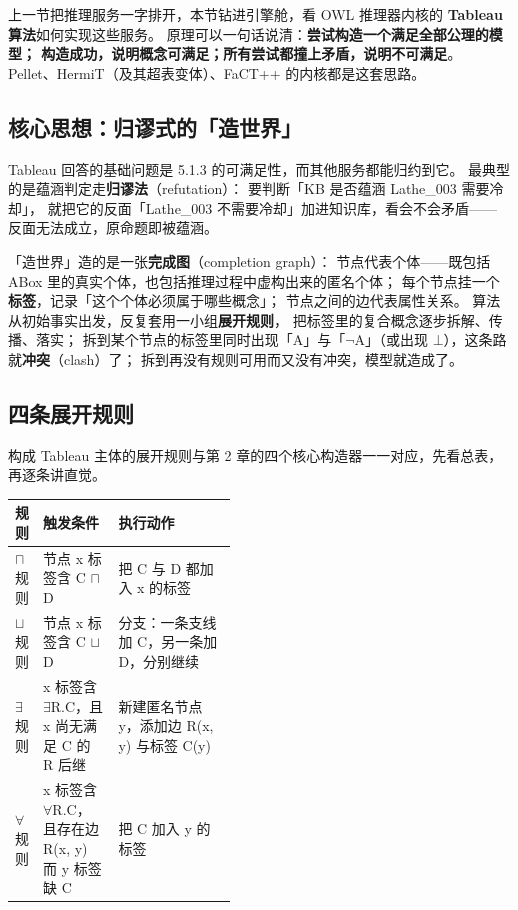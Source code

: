 上一节把推理服务一字排开，本节钻进引擎舱，看 OWL 推理器内核的
\textbf{Tableau 算法}如何实现这些服务。
原理可以一句话说清：\textbf{尝试构造一个满足全部公理的模型；
构造成功，说明概念可满足；所有尝试都撞上矛盾，说明不可满足}。
Pellet、HermiT（及其超表变体）、FaCT++ 的内核都是这套思路。

\subsection{核心思想：归谬式的「造世界」}

Tableau 回答的基础问题是 5.1.3 的可满足性，而其他服务都能归约到它。
最典型的是蕴涵判定走\textbf{归谬法}（refutation）：
要判断「KB 是否蕴涵 Lathe\_003 需要冷却」，
就把它的反面「Lathe\_003 不需要冷却」加进知识库，看会不会矛盾——
反面无法成立，原命题即被蕴涵。

「造世界」造的是一张\textbf{完成图}（completion graph）：
节点代表个体——既包括 ABox 里的真实个体，也包括推理过程中虚构出来的匿名个体；
每个节点挂一个\textbf{标签}，记录「这个个体必须属于哪些概念」；
节点之间的边代表属性关系。
算法从初始事实出发，反复套用一小组\textbf{展开规则}，
把标签里的复合概念逐步拆解、传播、落实；
拆到某个节点的标签里同时出现「A」与「\(\lnot\)A」（或出现 \(\bot\)），这条路就\textbf{冲突}（clash）了；
拆到再没有规则可用而又没有冲突，模型就造成了。

\subsection{四条展开规则}

构成 Tableau 主体的展开规则与第 2 章的四个核心构造器一一对应，先看总表，再逐条讲直觉。

\begin{center}
\begin{tabularx}{\linewidth}{@{}>{\centering\arraybackslash}p{0.10\linewidth}p{0.34\linewidth}X@{}}
\toprule
\textbf{规则} & \textbf{触发条件} & \textbf{执行动作} \\
\midrule
\(\sqcap\) 规则 & 节点 x 标签含 C \(\sqcap\) D & 把 C 与 D 都加入 x 的标签 \\
\(\sqcup\) 规则 & 节点 x 标签含 C \(\sqcup\) D & 分支：一条支线加 C，另一条加 D，分别继续 \\
\(\exists\) 规则 & x 标签含 \(\exists\)R.C，且 x 尚无满足 C 的 R 后继 & 新建匿名节点 y，添加边 R(x, y) 与标签 C(y) \\
\(\forall\) 规则 & x 标签含 \(\forall\)R.C，且存在边 R(x, y) 而 y 标签缺 C & 把 C 加入 y 的标签 \\
\bottomrule
\end{tabularx}
\end{center}

